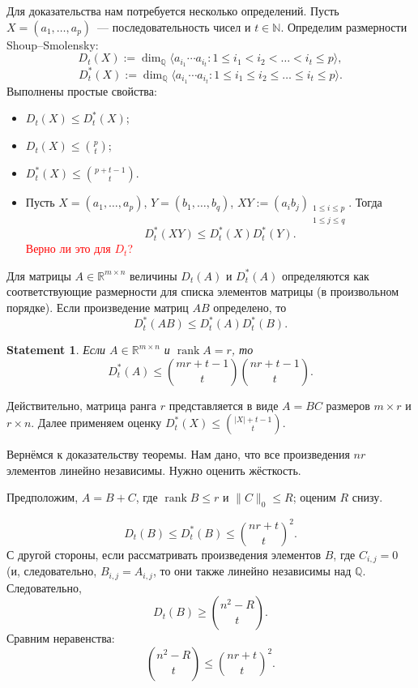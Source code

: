 \documentclass[handout]{beamer}
\renewcommand\le{\leqslant}
\renewcommand\ge{\geqslant}
\newcommand\R{\mathbb R}
\newtheorem*{statement}{Statement}
\DeclareMathOperator{\rank}{rank}
\begin{document}
\begin{frame}
    Для доказательства нам потребуется несколько определений.
    \pause
    Пусть $X=(a_1,\ldots,a_p)$~--- последовательность чисел и $t\in\mathbb
    N$. Определим размерности Shoup--Smolensky:
    $$
    D_t(X) := \dim_{\mathbb Q}\langle a_{i_1}\cdots a_{i_t}\colon 1\le
    i_1<i_2<\ldots<i_t\le p\rangle,
    $$
    \pause
    $$
    D_t^*(X) := \dim_{\mathbb Q}\langle a_{i_1}\cdots a_{i_t}\colon 1\le
    i_1\le i_2\le \ldots\le i_t\le p\rangle.
    $$
    \pause
    Выполнены простые свойства:
    \begin{itemize}
        \item $D_t(X)\le D_t^*(X)$;
            \pause
        \item $D_t(X)\le\binom{p}{t}$;
            \pause
        \item $D_t^*(X)\le\binom{p+t-1}{t}$.
            \pause
        \item Пусть $X=(a_1,\ldots,a_p)$, $Y=(b_1,\ldots,b_q)$,
            $XY:=(a_ib_j)_{\substack{1\le i\le p\\1\le j\le q}}$. Тогда
            $$
            D_t^*(XY) \le D_t^*(X)D_t^*(Y).
            $$
            \pause
            \textcolor{red}{Верно ли это для $D_t$?}
    \end{itemize}
\end{frame}

\begin{frame}
    Для матрицы $A\in\R^{m\times n}$ величины $D_t(A)$ и $D_t^*(A)$ определяются
    как соответствующие размерности для списка элементов матрицы (в произвольном
    порядке).
    \pause
    Если произведение матриц $AB$ определено, то
    $$
    D_t^*(AB)\le D_t^*(A)D_t^*(B).
    $$
    \pause
    \begin{statement}
        Если $A\in\R^{m\times n}$ и $\rank A=r$, то
        $$
        D_t^*(A) \le \binom{mr+t-1}{t}\binom{nr+t-1}{t}.
        $$
    \end{statement}
    \pause
    Действительно, матрица ранга $r$ представляется в виде $A=BC$ размеров
    $m\times r$ и $r\times n$. Далее применяем оценку 
    $D_t^*(X)\le\binom{|X|+t-1}{t}$.
\end{frame}


\begin{frame}
    Вернёмся к доказательству теоремы. Нам дано, что все произведения $nr$
    элементов линейно независимы. Нужно оценить жёсткость.
    \pause

    Предположим, $A=B+C$, где $\rank B\le r$ и $\|C\|_0\le R$; оценим $R$ снизу.
    \pause

    $$
    D_t(B)\le D_t^*(B) \le \binom{nr+t}{t}^2.
    $$
    \pause
    С другой стороны, если рассматривать произведения элементов $B$, где
    $C_{i,j}=0$ (и, следовательно, $B_{i,j}=A_{i,j}$, то они также линейно
    независимы над $\mathbb Q$. Следовательно,
    $$
    D_t(B) \ge \binom{n^2-R}{t}.
    $$
    \pause
    Сравним неравенства:
    $$
    \binom{n^2-R}{t} \le \binom{nr+t}{t}^2.
    $$
\end{frame}
\end{document}
